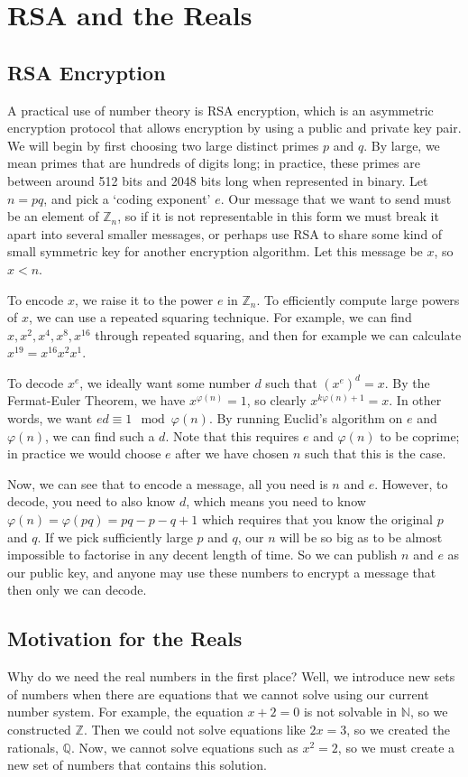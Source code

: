 \documentclass{article}
\begin{document}
\section{RSA and the Reals}
\subsection{RSA Encryption}
A practical use of number theory is RSA encryption, which is an asymmetric encryption protocol that allows encryption by using a public and private key pair. We will begin by first choosing two large distinct primes $p$ and $q$. By large, we mean primes that are hundreds of digits long; in practice, these primes are between around 512 bits and 2048 bits long when represented in binary. Let $n=pq$, and pick a `coding exponent' $e$. Our message that we want to send must be an element of $\mathbb Z_n$, so if it is not representable in this form we must break it apart into several smaller messages, or perhaps use RSA to share some kind of small symmetric key for another encryption algorithm. Let this message be $x$, so $x < n$.

To encode $x$, we raise it to the power $e$ in $\mathbb Z_n$. To efficiently compute large powers of $x$, we can use a repeated squaring technique. For example, we can find $x, x^2, x^4, x^8, x^{16}$ through repeated squaring, and then for example we can calculate $x^{19} = x^{16} x^{2} x^{1}$.

To decode $x^e$, we ideally want some number $d$ such that $(x^e)^d = x$. By the Fermat-Euler Theorem, we have $x^{\varphi(n)} = 1$, so clearly $x^{k\varphi(n) + 1} = x$. In other words, we want $ed \equiv 1 \mod \varphi(n)$. By running Euclid's algorithm on $e$ and $\varphi(n)$, we can find such a $d$. Note that this requires $e$ and $\varphi(n)$ to be coprime; in practice we would choose $e$ after we have chosen $n$ such that this is the case.

Now, we can see that to encode a message, all you need is $n$ and $e$. However, to decode, you need to also know $d$, which means you need to know $\varphi(n) = \varphi(pq) = pq - p - q + 1$ which requires that you know the original $p$ and $q$. If we pick sufficiently large $p$ and $q$, our $n$ will be so big as to be almost impossible to factorise in any decent length of time. So we can publish $n$ and $e$ as our public key, and anyone may use these numbers to encrypt a message that then only we can decode.

\subsection{Motivation for the Reals}
Why do we need the real numbers in the first place? Well, we introduce new sets of numbers when there are equations that we cannot solve using our current number system. For example, the equation $x+2=0$ is not solvable in $\mathbb N$, so we constructed $\mathbb Z$. Then we could not solve equations like $2x = 3$, so we created the rationals, $\mathbb Q$. Now, we cannot solve equations such as $x^2 = 2$, so we must create a new set of numbers that contains this solution.
\end{document}
